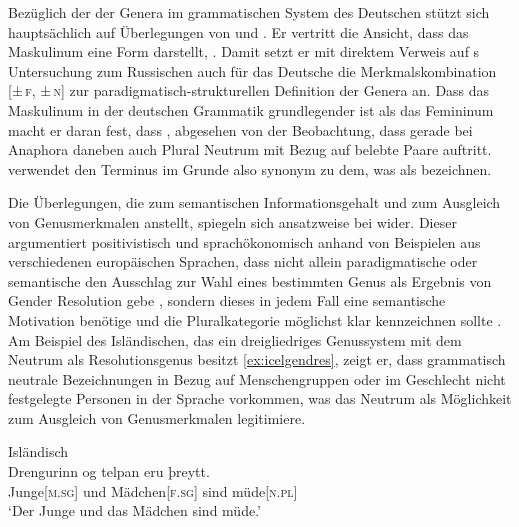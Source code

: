Bezüglich der  der Genera im grammatischen System des
Deutschen stützt sich \citet{askedal1973} hauptsächlich auf Überlegungen von
\citet{jakobson1932} und \citet{bierwisch1967}. Er vertritt die Ansicht, dass
das Maskulinum eine  Form darstellt,
. Damit setzt er mit
direktem Verweis auf \citeauthor{jakobson1932}s Untersuchung zum Russischen
auch für das Deutsche die Merkmalskombination [\textsc{±\,f, ±\,n}] zur
paradigmatisch-strukturellen Definition der Genera an. Dass das Maskulinum in
der deutschen Grammatik grundlegender ist als das Femininum macht er daran
fest, dass , abgesehen von der Beobachtung,
dass gerade bei Anaphora daneben auch Plural Neutrum mit Bezug auf belebte
Paare auftritt. \citet{askedal1973} verwendet den Terminus  im
Grunde also synonym zu dem, was \textcites[205--218]{corbett1991}{wechsler2009}
als  bezeichnen.

Die Überlegungen, die \citeauthor{askedal1973} zum semantischen
Informationsgehalt und zum Ausgleich von Genusmerkmalen anstellt, spiegeln sich
ansatzweise bei \citet{corbett1991} wider. Dieser argumentiert positivistisch
und sprachökonomisch anhand von Beispielen aus verschiedenen europäischen
Sprachen, dass nicht allein paradigmatische oder semantische
 den Ausschlag zur Wahl eines bestimmten Genus als Ergebnis
von Gender Resolution gebe \autocite[290--293]{corbett1991}, sondern dieses
 in jedem Fall eine semantische Motivation benötige und
die Plural\-kategorie möglichst klar kennzeichnen sollte
\autocite[293--299]{corbett1991}. Am Beispiel des Isländischen, das ein
dreigliedriges Genussystem mit dem Neutrum als Resolutionsgenus besitzt
\cref{ex:icelgendres}, zeigt er, dass grammatisch neutrale Bezeichnungen in
Bezug auf Menschen\-gruppen oder im Geschlecht nicht festgelegte Personen in
der Sprache vorkommen, was das Neutrum als Möglichkeit zum Ausgleich von
Genusmerkmalen legiti\-miere.

\begin{exe}
\ex \label{ex:icelgendres}
	Isländisch \parencites[nach][283]{corbett1991}[569]{wechsler2009}\\
	\gll Drengurinn og telpan eru þreytt. \\
		Junge[\textsc{m.sg}] und Mädchen[\textsc{f.sg}] sind
		müde[\textsc{n.pl}] \\
	\trans `Der Junge und das Mädchen sind müde.'
\end{exe}


